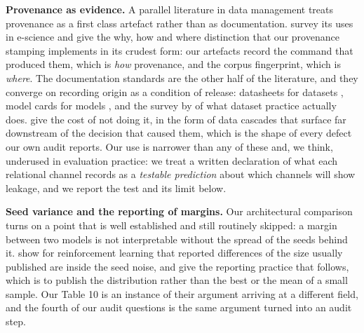 \documentclass[twoside,11pt]{article}
\begin{document}
\textbf{Provenance as evidence.} A parallel literature in data management treats provenance as a first class artefact rather than as documentation. \citet{simmhan} survey its uses in e-science and \citet{cheney} give the why, how and where distinction that our provenance stamping implements in its crudest form: our artefacts record the command that produced them, which is \emph{how} provenance, and the corpus fingerprint, which is \emph{where}. The documentation standards are the other half of the literature, and they converge on recording origin as a condition of release: datasheets for datasets \citep{datasheets}, model cards for models \citep{modelcards}, and the survey by \citet{paullada} of what dataset practice actually does. \citet{sambasivan} give the cost of not doing it, in the form of data cascades that surface far downstream of the decision that caused them, which is the shape of every defect our own audit reports. Our use is narrower than any of these and, we think, underused in evaluation practice: we treat a written declaration of what each relational channel records as a \emph{testable prediction} about which channels will show leakage, and we report the test and its limit below.

\textbf{Seed variance and the reporting of margins.} Our architectural comparison turns on a point that is well established and still routinely skipped: a margin between two models is not interpretable without the spread of the seeds behind it. \citet{henderson} show for reinforcement learning that reported differences of the size usually published are inside the seed noise, and \citet{dodge} give the reporting practice that follows, which is to publish the distribution rather than the best or the mean of a small sample. Our Table 10 is an instance of their argument arriving at a different field, and the fourth of our audit questions is the same argument turned into an audit step.
\end{document}
